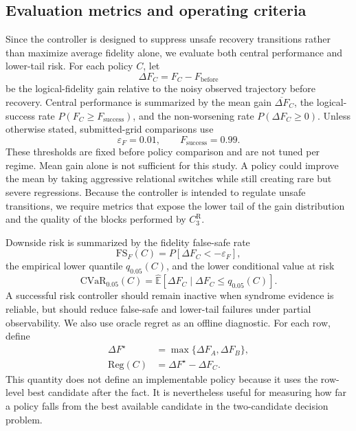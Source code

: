 \documentclass{iopjournal}
\begin{document}
\subsection{Evaluation metrics and operating criteria}\label{subsec:evaluation-metrics}

Since the controller is designed to suppress unsafe recovery transitions rather than
maximize average fidelity alone, we evaluate both central performance and
lower-tail risk. For each policy $C$, let
\begin{equation}
\Delta F_C=F_C-F_{\mathrm{before}}
\end{equation}
be the logical-fidelity gain relative to the noisy observed trajectory before
recovery. Central performance is summarized by the mean gain
$\overline{\Delta F}_C$, the logical-success rate
$P(F_C\ge F_{\mathrm{success}})$, and the non-worsening rate
$P(\Delta F_C\ge0)$.
Unless otherwise stated, submitted-grid comparisons use
\begin{equation}
\varepsilon_F=0.01,\qquad F_{\mathrm{success}}=0.99.
\end{equation}
These thresholds are fixed before policy comparison and are not tuned per regime.
Mean gain alone is not sufficient for this study. A policy could improve the mean
by taking aggressive relational switches while still creating rare but severe
regressions. Because the controller is intended to regulate unsafe transitions, we
require metrics that expose the lower tail of the gain distribution and the
quality of the blocks performed by $C_3^{\mathrm R}$.

Downside risk is summarized by the fidelity false-safe rate
\begin{equation}
\mathrm{FS}_F(C)
=
P\!\left[\Delta F_C<-\varepsilon_F\right],
\end{equation}
the empirical lower quantile $q_{0.05}(C)$, and the lower conditional value at risk
\begin{equation}
\mathrm{CVaR}_{0.05}(C)
=
\widehat{\mathbb{E}}
\left[
\Delta F_C\mid \Delta F_C\le q_{0.05}(C)
\right].
\end{equation}
A successful risk controller should remain inactive when syndrome evidence is
reliable, but should reduce false-safe and lower-tail failures under partial
observability.
We also use oracle regret as an offline diagnostic. For each row, define
\begin{equation}
\begin{aligned}
\Delta F^\star
&=
\max\{\Delta F_A,\Delta F_B\},\\
\mathrm{Reg}(C)
&=
\Delta F^\star-\Delta F_C.
\end{aligned}
\end{equation}
This quantity does not define an implementable policy because it uses the
row-level best candidate after the fact. It is nevertheless useful for measuring
how far a policy falls from the best available candidate in the two-candidate
decision problem.
\end{document}
